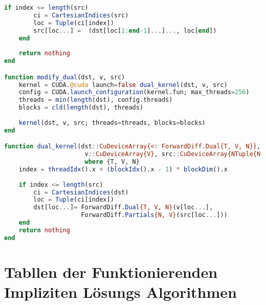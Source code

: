 \begin{lstlisting}[language=Julia]
    if index <= length(src)
        ci = CartesianIndices(src)
        loc = Tuple(ci[index])
        src[loc...] =  (dst[loc[1:end-1]...]..., loc[end])
    end
    
    return nothing
end

function modify_dual(dst, v, src)
    kernel = CUDA.@cuda launch=false dual_kernel(dst, v, src)
    config = CUDA.launch_configuration(kernel.fun; max_threads=256)
    threads = min(length(dst), config.threads)
    blocks = cld(length(dst), threads)
    
    kernel(dst, v, src; threads=threads, blocks=blocks)
end

function dual_kernel(dst::CuDeviceArray{<: ForwardDiff.Dual{T, V, N}}, 
                      v::CuDeviceArray{V}, src::CuDeviceArray{NTuple{N, V}}) 
                      where {T, V, N}
    index = threadIdx().x + (blockIdx().x - 1) * blockDim().x
   
    if index <= length(src)
        ci = CartesianIndices(dst)
        loc = Tuple(ci[index])
        dst[loc...]= ForwardDiff.Dual{T, V, N}(v[loc...], 
                     ForwardDiff.Partials{N, V}(src[loc...]))
    end
    return nothing
end
\end{lstlisting}

\section{Tabllen der Funktionierenden Impliziten Lösungs Algorithmen}

